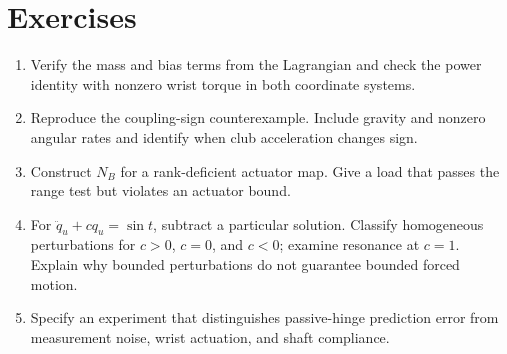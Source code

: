 \documentclass[12pt, openany]{book}
\theoremstyle{plain}
\begin{document}
\section{Exercises}

\begin{enumerate}
\item Verify the mass and bias terms from the Lagrangian and check the power
identity with nonzero wrist torque in both coordinate systems.
\item Reproduce the coupling-sign counterexample. Include gravity and nonzero
angular rates and identify when club acceleration changes sign.
\item Construct $N_B$ for a rank-deficient actuator map. Give a load that passes
the range test but violates an actuator bound.
\item For $\ddot q_u+cq_u=\sin t$, subtract a particular solution. Classify
homogeneous perturbations for $c>0$, $c=0$, and $c<0$; examine resonance at $c=1$.
Explain why bounded perturbations do not guarantee bounded forced motion.
\item Specify an experiment that distinguishes passive-hinge prediction error
from measurement noise, wrist actuation, and shaft compliance.
\end{enumerate}
\end{document}
